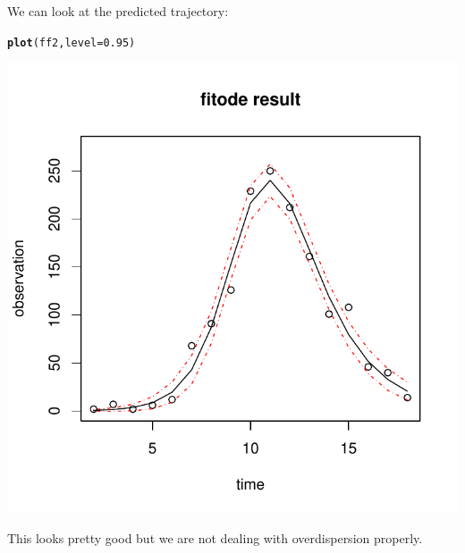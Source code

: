 \documentclass{article}\usepackage[]{graphicx}\usepackage[]{color}
\makeatletter
\def\maxwidth{ %
  \ifdim\Gin@nat@width>\linewidth
    \linewidth
  \else
    \Gin@nat@width
  \fi
}
\newcommand{\hlnum}[1]{\textcolor[rgb]{0.686,0.059,0.569}{#1}}%
\newcommand{\hlstd}[1]{\textcolor[rgb]{0.345,0.345,0.345}{#1}}%
\newcommand{\hlkwc}[1]{\textcolor[rgb]{0.333,0.667,0.333}{#1}}%
\newcommand{\hlkwd}[1]{\textcolor[rgb]{0.737,0.353,0.396}{\textbf{#1}}}%
\newenvironment{kframe}{%
 \def\at@end@of@kframe{}%
 \ifinner\ifhmode%
  \def\at@end@of@kframe{\end{minipage}}%
  \begin{minipage}{\columnwidth}%
 \fi\fi%
 \def\FrameCommand##1{\hskip\@totalleftmargin \hskip-\fboxsep
 \colorbox{shadecolor}{##1}\hskip-\fboxsep
     \hskip-\linewidth \hskip-\@totalleftmargin \hskip\columnwidth}%
 \MakeFramed {\advance\hsize-\width
   \@totalleftmargin\z@ \linewidth\hsize
   \@setminipage}}%
 {\par\unskip\endMakeFramed%
 \at@end@of@kframe}
\newenvironment{knitrout}{}{} %
\makeatother
\begin{document}
We can look at the predicted trajectory:

\begin{knitrout}
\color{fgcolor}\begin{kframe}
\begin{alltt}
\hlkwd{plot}\hlstd{(ff2,} \hlkwc{level}\hlstd{=}\hlnum{0.95}\hlstd{)}
\end{alltt}
\end{kframe}
\includegraphics[width=\maxwidth]{figure/plot-1} 

\end{knitrout}

This looks pretty good but we are not dealing with overdispersion properly.
\end{document}
